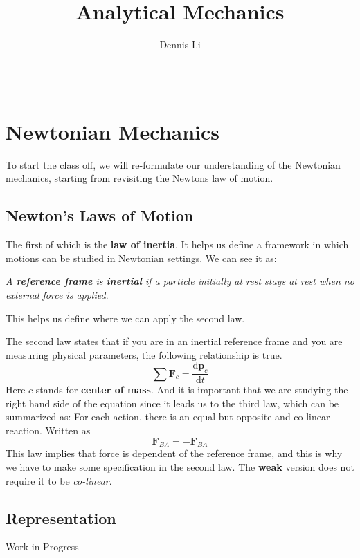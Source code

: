 \documentclass[12pt]{article}
\title{\textbf{Analytical Mechanics}}
\author{Dennis Li}
\newcommand{\dydx}[2]{\frac{\text{d} #1}{\text{d} #2}}
\begin{document}
\maketitle
\hrule


\section{Newtonian Mechanics}
To start the class off, we will re-formulate our understanding of the Newtonian mechanics, starting from revisiting the Newtons law of motion. 

\subsection{Newton's Laws of Motion}
The first of which is the \textbf{law of inertia}. It helps us define a framework in which motions can be studied in Newtonian settings. We can see it as: 

\textit{A \textbf{reference frame} is \textbf{inertial} if a particle initially at rest stays at rest when no external force is applied}. 


This helps us define where we can apply the second law.

The second law states that if you are in an inertial reference frame and you are measuring physical parameters, the following relationship is true.
\[
\sum \mathbf{F}_{c} = \dydx{\mathbf{p}_{c}}{t}
\]
Here $c$ stands for \textbf{center of mass}. And it is important that we are studying the right hand side of the equation since it leads us to the third law, which can be summarized as: For each action, there is an equal but opposite and co-linear reaction. Written as
\[
\mathbf{F}_{BA} = - \mathbf{F}_{BA}
\]
This law implies that force is dependent of the reference frame, and this is why we have to make some specification in the second law. The \textbf{weak} version does not require it to be \textit{co-linear}.


\subsection{Representation}
Work in Progress
\end{document}
